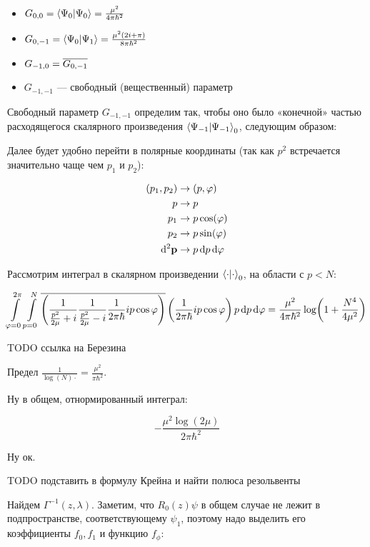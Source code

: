 \begin{itemize}
\item $G_{0, 0} = \ip{\Psi_0}{\Psi_0} = \frac{\mu^2}{4 \pi \hbar^2}$
\item $G_{0, -1} = \ip{\Psi_0}{\Psi_1} = \frac{\mu^2 (2 i + \pi)}{8 \pi \hbar^2}$
\item $G_{-1, 0} = \overline{G_{0, -1}}$
\item $G_{-1, -1}$ — свободный (вещественный) параметр
\end{itemize}

Свободный параметр $G_{-1, -1}$ определим так, чтобы оно было «конечной» частью расходящегося скалярного произведения $\ip{\Psi_{-1}}{\Psi_{-1}}_0$, следующим образом:

Далее будет удобно перейти в полярные координаты (так как $p^2$ встречается значительно чаще чем $p_1$ и $p_2$):

\begin{align*}
(p_1, p_2) &\to (p, \varphi) \\
p &\to p \\
p_1 &\to p \cos(\varphi) \\
p_2 &\to p \sin(\varphi) \\
\dd[2]{\vb{p}} &\to p \dd{p} \dd{\varphi}
\end{align*}

Рассмотрим интеграл в скалярном произведении $\ip{\cdot}{\cdot}_0$, на области с $p < N$:

\[
\int\limits_{\varphi = 0}^{2 \pi} \int\limits_{p = 0}^N
\overline{\left(
\frac{1}{\frac{p^2}{2 \mu} + i} \frac{1}{\frac{p^2}{2 \mu} - i} \frac{1}{2 \pi \hbar} i p \cos \varphi
\right)}
\left(
\frac{1}{2 \pi \hbar} i p \cos \varphi
\right)
p \dd{p} \dd{\varphi}
=
\frac{\mu^2}{4 \pi \hbar^2} \log(1 + \frac{N^4}{4 \mu^2})
\]

TODO ссылка на Березина

Предел $\frac{1}{\log(N) \cdot} = \frac{\mu^2}{\pi \hbar^2}$.

Ну в общем, отнормированный интеграл:

\[
-\frac{\mu^2 \log (2 \mu)}{2 \pi  \hbar ^2}
\]

Ну ок.

TODO подставить в формулу Крейна и найти полюса резольвенты

Найдем $\Gamma^{-1}(z, \lambda)$. Заметим, что $R_0(z) \psi$ в общем случае не лежит в подпространстве, соответствующему $\psi_1$, поэтому надо выделить его коэффициенты $f_0, f_1$ и функцию $f_\phi$:


